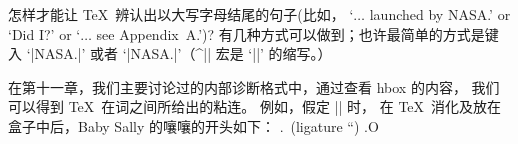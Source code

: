 \dangerexercise 怎样才能让 \TeX\ 辨认出以大写字母结尾的句子(比如，
`$\ldots$ launched by NASA.\null' or
`Did I?' or `$\ldots$ see Appendix~A.')?
\answer 有几种方式可以做到；也许最简单的方式是键入
`|\hbox{NASA}.|' 或者 `|NASA\null.|'（^|\null| 宏是 `|\hbox{}|' 的缩写。）

\danger \1在第十一章，我们主要讨论过的内部诊断格式中，通过查看 hbox 的内容，
我们可以得到 \TeX\ 在词之间所给出的粘连。
例如，假定 |\nonfrenchspacing| 时，
在 \TeX\ 消化及放在盒子中后，Baby Sally 的嚷嚷的开头如下：
\begintt
.\tenrm \ (ligature ``)
.\tenrm O
